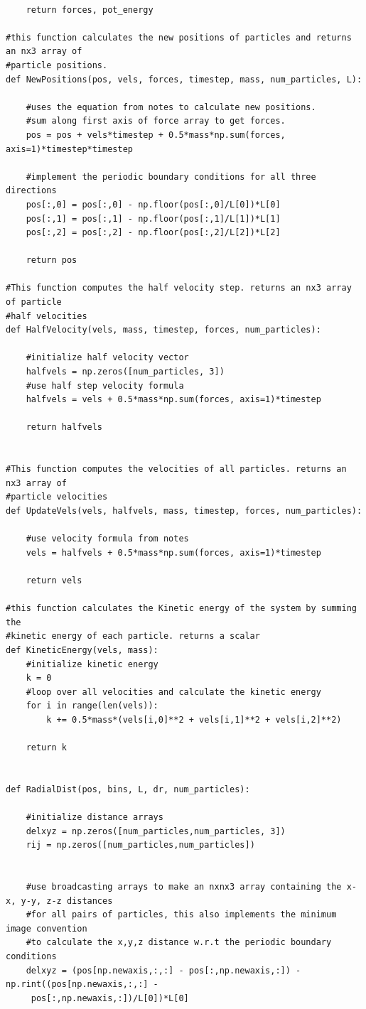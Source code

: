 \documentclass{article}
\begin{document}
\begin{lstlisting}
    
    return forces, pot_energy

#this function calculates the new positions of particles and returns an nx3 array of 
#particle positions. 
def NewPositions(pos, vels, forces, timestep, mass, num_particles, L):
    
    #uses the equation from notes to calculate new positions.
    #sum along first axis of force array to get forces.
    pos = pos + vels*timestep + 0.5*mass*np.sum(forces, axis=1)*timestep*timestep
   
    #implement the periodic boundary conditions for all three directions
    pos[:,0] = pos[:,0] - np.floor(pos[:,0]/L[0])*L[0]
    pos[:,1] = pos[:,1] - np.floor(pos[:,1]/L[1])*L[1]
    pos[:,2] = pos[:,2] - np.floor(pos[:,2]/L[2])*L[2]
    
    return pos

#This function computes the half velocity step. returns an nx3 array of particle
#half velocities
def HalfVelocity(vels, mass, timestep, forces, num_particles):
    
    #initialize half velocity vector
    halfvels = np.zeros([num_particles, 3])
    #use half step velocity formula
    halfvels = vels + 0.5*mass*np.sum(forces, axis=1)*timestep
    
    return halfvels


#This function computes the velocities of all particles. returns an nx3 array of 
#particle velocities
def UpdateVels(vels, halfvels, mass, timestep, forces, num_particles):
    
    #use velocity formula from notes
    vels = halfvels + 0.5*mass*np.sum(forces, axis=1)*timestep
    
    return vels
    
#this function calculates the Kinetic energy of the system by summing the 
#kinetic energy of each particle. returns a scalar
def KineticEnergy(vels, mass):
    #initialize kinetic energy
    k = 0
    #loop over all velocities and calculate the kinetic energy
    for i in range(len(vels)):
        k += 0.5*mass*(vels[i,0]**2 + vels[i,1]**2 + vels[i,2]**2)
    
    return k


def RadialDist(pos, bins, L, dr, num_particles):
    
    #initialize distance arrays
    delxyz = np.zeros([num_particles,num_particles, 3])
    rij = np.zeros([num_particles,num_particles])
            
    
    #use broadcasting arrays to make an nxnx3 array containing the x-x, y-y, z-z distances
    #for all pairs of particles, this also implements the minimum image convention
    #to calculate the x,y,z distance w.r.t the periodic boundary conditions
    delxyz = (pos[np.newaxis,:,:] - pos[:,np.newaxis,:]) - np.rint((pos[np.newaxis,:,:] -
     pos[:,np.newaxis,:])/L[0])*L[0]
    

\end{lstlisting}
\end{document}
